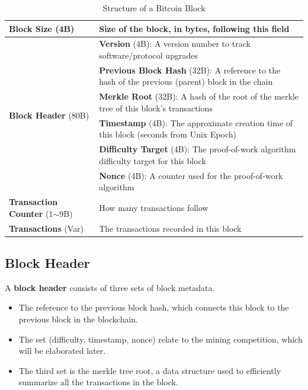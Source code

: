 \documentclass{article}
\newcounter{algo}[section]
\begin{document}
    \begin{table}[H]
    \centering
    \begin{tabular}{|p{}|p{}|}
    \hline
    \textbf{Block Size} (4B) & Size of the block, in bytes, following this field \\
    \hline
    \multirow{6}{*}{\textbf{Block Header} (80B)} & \textbf{Version} (4B): A version number to track software/protocol upgrades \\
    \cline{2-2}
     & \textbf{Previous Block Hash} (32B): A reference to the hash of the previous (parent) block in the chain \\
    \cline{2-2}
     & \textbf{Merkle Root} (32B): A hash of the root of the merkle tree of this block's transactions \\
    \cline{2-2}
     & \textbf{Timestamp} (4B): The approximate creation time of this block (seconds from Unix Epoch) \\
    \cline{2-2}
     & \textbf{Difficulty Target} (4B): The proof-of-work algorithm difficulty target for this block \\
    \cline{2-2}
     & \textbf{Nonce} (4B): A counter used for the proof-of-work algorithm \\
    \hline
    \textbf{Transaction Counter} (1$\sim$9B) & How many transactions follow \\
    \hline
    \textbf{Transactions} (Var) & The transactions recorded in this block \\
    \hline
    \end{tabular}
    \caption{Structure of a Bitcoin Block}
    \end{table}

  \subsection{Block Header}

    A \textbf{block header} consists of three sets of block metadata.
    \begin{itemize}
      \item The reference to the previous block hash, which connects this block to the previous block in the blockchain.
      \item The set (difficulty, timestamp, nonce) relate to the mining competition, which will be elaborated later.
      \item The third set is the merkle tree root, a data structure used to efficiently summarize all the transactions in the block.
    \end{itemize}
\end{document}
